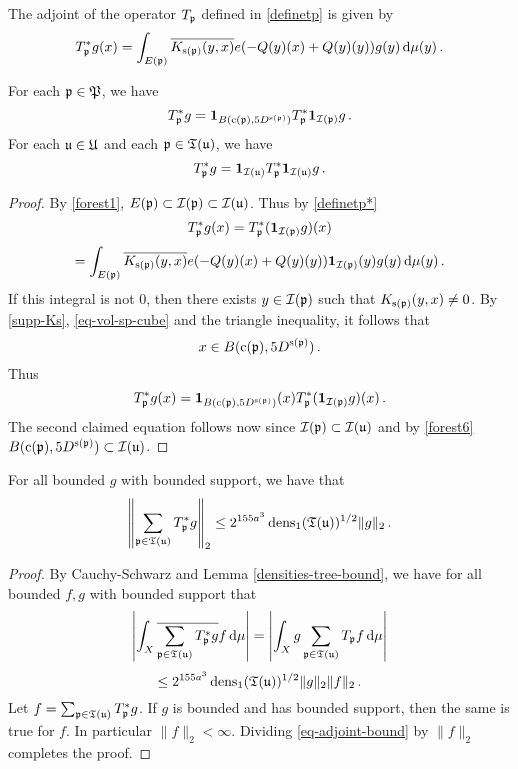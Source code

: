 {The adjoint of the operator $T_{{\mathfrak p}}$ defined in \eqref{definetp} is given by
\begin{equation}
    \label{definetp*}
    T_{{\mathfrak p}}^* g(x) = \int_{E({\mathfrak p})} \overline{K_{{\mathrm{s}}({\mathfrak p})}(y,x)} e(-{Q}(y)(x)+ {Q}(y)(y)) g(y) \, \mathrm{d}\mu(y)\,.
\end{equation}

\begin{lemma}
    \label{adjoint-tile-support}
    For each ${\mathfrak p} \in {\mathfrak P}$, we have
    $$
        T_{{\mathfrak p}}^* g = \mathbf{1}_{B({\mathrm{c}}({\mathfrak p}), 5D^{{\mathrm{s}}({\mathfrak p})})} T_{{\mathfrak p}}^* \mathbf{1}_{{\mathcal{I}}({\mathfrak p})} g\,.
    $$
    For each ${\mathfrak u} \in {\mathfrak U}$ and each ${\mathfrak p} \in {\mathfrak T}({\mathfrak u})$, we have
    $$
        T_{{\mathfrak p}}^* g = \mathbf{1}_{{\mathcal{I}}({\mathfrak u})} T_{{\mathfrak p}}^* \mathbf{1}_{{\mathcal{I}}({\mathfrak u})} g\,.
    $$
\end{lemma}

\begin{proof}
    By \eqref{forest1}, $E({\mathfrak p}) \subset {\mathcal{I}}({\mathfrak p}) \subset {\mathcal{I}}({\mathfrak u})$. Thus by \eqref{definetp*}
    $$
         T_{{\mathfrak p}}^* g(x) =  T_{{\mathfrak p}}^* (\mathbf{1}_{{\mathcal{I}}({\mathfrak p})} g)(x)
    $$
    $$
        = \int_{E({\mathfrak p})} \overline{K_{{\mathrm{s}}({\mathfrak p})}(y,x)} e(-{Q}(y)(x) +  {Q}(y)(y)) \mathbf{1}_{{\mathcal{I}}({\mathfrak p})}(y) g(y) \, \mathrm{d}\mu(y)\,.
    $$
    If this integral is not $0$, then there exists $y \in {\mathcal{I}}({\mathfrak p})$ such that $K_{{\mathrm{s}}({\mathfrak p})}(y,x) \ne 0$. By \eqref{supp-Ks}, \eqref{eq-vol-sp-cube} and the triangle inequality, it follows that
    \begin{equation*}
        x \in B({\mathrm{c}}({\mathfrak p}), 5 D^{{\mathrm{s}}({\mathfrak p})})\, .
    \end{equation*}
    Thus
    $$
        T_{{\mathfrak p}}^* g(x) = \mathbf{1}_{B({\mathrm{c}}({\mathfrak p}), 5D^{{\mathrm{s}}({\mathfrak p})})}(x) T_{{\mathfrak p}}^* (\mathbf{1}_{{\mathcal{I}}({\mathfrak p})} g)(x)\,.
    $$
    The second claimed equation follows now since ${\mathcal{I}}({\mathfrak p}) \subset {\mathcal{I}}({\mathfrak u})$ and by \eqref{forest6} $B({\mathrm{c}}({\mathfrak p}), 5D^{{\mathrm{s}}({\mathfrak p})}) \subset {\mathcal{I}}({\mathfrak u})$.
\end{proof}

\begin{lemma}
    \label{adjoint-tree-estimate}
    For all bounded $g$ with bounded support, we have that
    $$
        \left\| \sum_{{\mathfrak p} \in {\mathfrak T}({\mathfrak u})} T_{{\mathfrak p}}^* g\right\|_2 \le 2^{155a^3} \operatorname{\operatorname{dens}}_1({\mathfrak T}({\mathfrak u}))^{1/2} \|g\|_2\,.
    $$
\end{lemma}

\begin{proof}
    By Cauchy-Schwarz and Lemma \ref{densities-tree-bound}, we have for all bounded $f,g$ with bounded support that
    $$
        \left| \int_X \overline{\sum_{{\mathfrak p}\in {\mathfrak T}({\mathfrak u})} T_{{\mathfrak p}}^* g} f \,\mathrm{d}\mu \right| = \left| \int_X g \sum_{{\mathfrak p} \in {\mathfrak T}({\mathfrak u})} T_{{\mathfrak p}} f \,\mathrm{d}\mu \right|
    $$
    \begin{equation}
        \label{eq-adjoint-bound}
        \le 2^{155a^3} \operatorname{\operatorname{dens}}_1({\mathfrak T}({\mathfrak u}))^{1/2} \|g\|_2 \|f\|_2\,.
    \end{equation}
    Let $f = \sum_{{\mathfrak p} \in {\mathfrak T}({\mathfrak u})} T_{{\mathfrak p}}^* g$. If $g$ is bounded and has bounded support, then the same is true for $f$. In particular $\|f\|_2 < \infty$. Dividing \eqref{eq-adjoint-bound} by $\|f\|_2$ completes the proof.
\end{proof}

}
